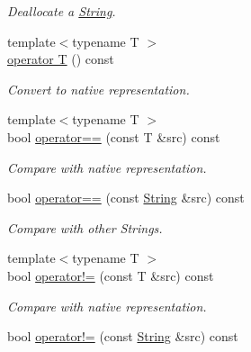 \begin{DoxyCompactItemize}
\begin{DoxyCompactList}\small\item\em Deallocate a \hyperlink{classGUI_1_1String}{String}. \end{DoxyCompactList}\item 
{\footnotesize template$<$typename T $>$ }\\\hyperlink{classGUI_1_1String_a779a14fba54f0c4c75353581ce6fe6fd}{operator T} () const 
\begin{DoxyCompactList}\small\item\em Convert to native representation. \end{DoxyCompactList}\item 
\hypertarget{classGUI_1_1String_af3161a9deb32267e1e7906ffcf9e6b18}{{\footnotesize template$<$typename T $>$ }\\bool \hyperlink{classGUI_1_1String_af3161a9deb32267e1e7906ffcf9e6b18}{operator==} (const T \&src) const }\label{classGUI_1_1String_af3161a9deb32267e1e7906ffcf9e6b18}

\begin{DoxyCompactList}\small\item\em Compare with native representation. \end{DoxyCompactList}\item 
\hypertarget{classGUI_1_1String_a36fc4528094c80b4375f11f27581d830}{bool \hyperlink{classGUI_1_1String_a36fc4528094c80b4375f11f27581d830}{operator==} (const \hyperlink{classGUI_1_1String}{String} \&src) const }\label{classGUI_1_1String_a36fc4528094c80b4375f11f27581d830}

\begin{DoxyCompactList}\small\item\em Compare with other Strings. \end{DoxyCompactList}\item 
\hypertarget{classGUI_1_1String_ae9a9ed83e3a3bfc89a4503e3d1433b77}{{\footnotesize template$<$typename T $>$ }\\bool \hyperlink{classGUI_1_1String_ae9a9ed83e3a3bfc89a4503e3d1433b77}{operator!=} (const T \&src) const }\label{classGUI_1_1String_ae9a9ed83e3a3bfc89a4503e3d1433b77}

\begin{DoxyCompactList}\small\item\em Compare with native representation. \end{DoxyCompactList}\item 
\hypertarget{classGUI_1_1String_ae9fc4a45b2353174c7f78343a591b81a}{bool \hyperlink{classGUI_1_1String_ae9fc4a45b2353174c7f78343a591b81a}{operator!=} (const \hyperlink{classGUI_1_1String}{String} \&src) const }\label{classGUI_1_1String_ae9fc4a45b2353174c7f78343a591b81a}


\end{DoxyCompactItemize}
